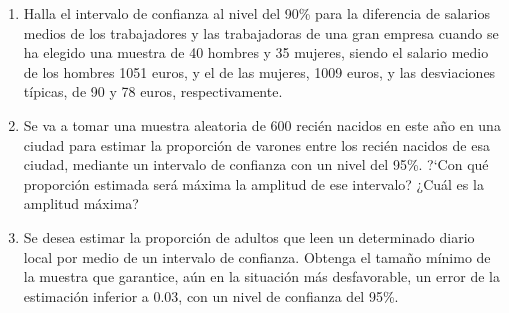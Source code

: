 \begin{adjustwidth}{20pt}{10pt}
\begin{enumerate}[PB. 1. ]
		\hspace{-1cm}\vspace{1cm}
		
	\item 	 Halla el intervalo de confianza al nivel del 90\% para la diferencia de salarios medios de los trabajadores y las trabajadoras de una gran empresa cuando se ha elegido una muestra de 40 hombres y 35 mujeres, siendo el salario medio de los hombres 1051 euros, y el de las mujeres, 1009 euros, y las desviaciones típicas, de 90 y 78 euros, respectivamente. 
		
		\hspace{-1cm}\vspace{1cm}
		
	\item 	Se va a tomar una muestra aleatoria de 600 recién nacidos en este año en una ciudad para estimar la proporción de varones entre los recién nacidos de esa ciudad, mediante un intervalo de confianza con un nivel del 95\%. ?`Con qué proporción estimada será máxima la amplitud de ese intervalo? ¿Cuál es la amplitud máxima?

		\hspace{-1cm}\vspace{1cm}
		
		\vspace{-10mm} %
		\hspace{-1cm}\vspace{1cm}
		
	\item 	Se desea estimar la proporción de adultos que leen un determinado diario local por medio de un intervalo de confianza. Obtenga el tamaño mínimo de la muestra que garantice, aún en la situación más desfavorable, un error de la estimación inferior a 0.03, con un nivel de confianza del 95\%. 
		
		\hspace{-1cm}\vspace{1cm}
		

\end{enumerate}
\end{adjustwidth}



